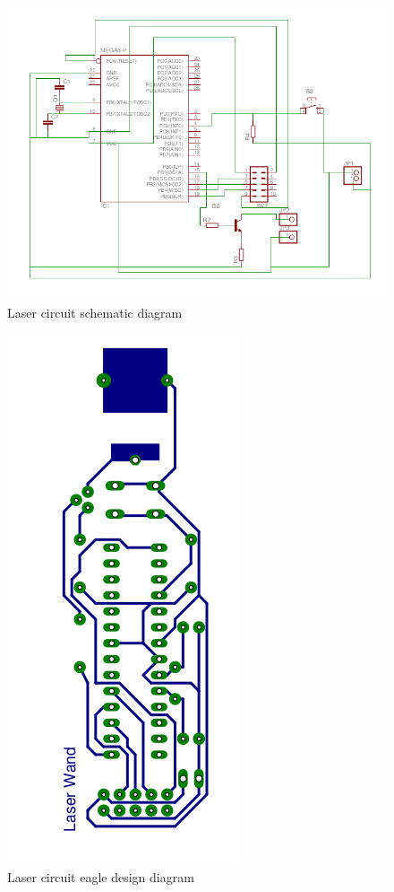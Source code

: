 \documentclass[12pt, a4paper]{article}
\begin{document}
\begin{figure}[htp]
	\centering
	\includegraphics[scale=0.25]{schematic.png}
	\caption{Laser circuit schematic diagram}
	\label{}
\end{figure}

\begin{figure}[htp]
	\centering
	\includegraphics[scale=0.20]{eagle-non-mirror.png}
	\caption{Laser circuit eagle design diagram}
	\label{}
\end{figure}
\end{document}
